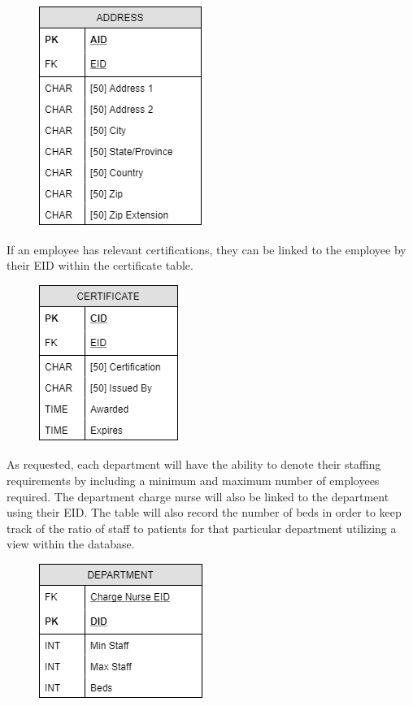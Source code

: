 \documentclass[letter,12pt]{texMemo}
\begin{document}
\begin{figure}[H]
	\centering
	\includegraphics[scale=.6]{address.png}
\end{figure}

If an employee has relevant certifications, they can be linked to the employee by their EID within the certificate table.
\begin{figure}[H]
	\centering
	\includegraphics[scale=.6]{certificate.png}
\end{figure}

As requested, each department will have the ability to denote their staffing requirements by including a minimum and maximum number of employees required. The department charge nurse will also be linked to the department using their EID. The table will also record the number of beds in order to keep track of the ratio of staff to patients for that particular department utilizing a view within the database.
\begin{figure}[H]
	\centering
	\includegraphics[scale=.6]{department.png}
\end{figure}
\end{document}
